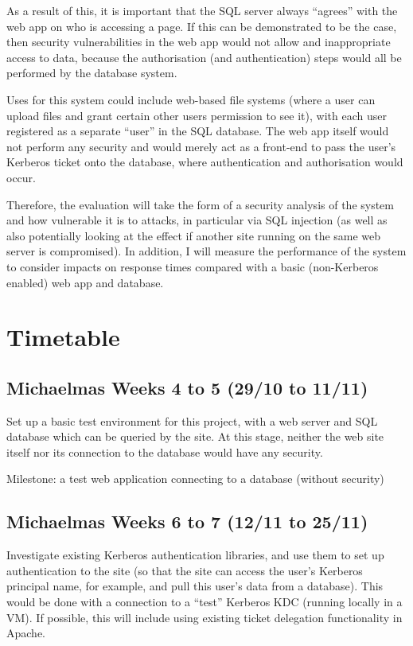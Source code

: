 \documentclass{standalone}
\begin{document}
As a result of this, it is important that the SQL server always ``agrees'' with the web app on who is accessing a page. If this can be demonstrated to be the case, then security vulnerabilities in the web app would not allow and inappropriate access to data, because the authorisation (and authentication) steps would all be performed by the database system.

Uses for this system could include web-based file systems (where a user can upload files and grant certain other users permission to see it), with each user registered as a separate ``user'' in the SQL database. The web app itself would not perform any security and would merely act as a front-end to pass the user's Kerberos ticket onto the database, where authentication and authorisation would occur.

Therefore, the evaluation will take the form of a security analysis of the system and how vulnerable it is to attacks, in particular via SQL injection (as well as also potentially looking at the effect if another site running on the same web server is compromised). In addition, I will measure the performance of the system to consider impacts on response times compared with a basic (non-Kerberos enabled) web app and database.

\section*{Timetable}
\subsection*{Michaelmas Weeks 4 to 5 (29/10 to 11/11)}
Set up a basic test environment for this project, with a web server and SQL database which can be queried by the site. At this stage, neither the web site itself nor its connection to the database would have any security.

Milestone: a test web application connecting to a database (without security)

\subsection*{Michaelmas Weeks 6 to 7 (12/11 to 25/11)}
Investigate existing Kerberos authentication libraries, and use them to set up authentication to the site (so that the site can access the user's Kerberos principal name, for example, and pull this user's data from a database). This would be done with a connection to a ``test'' Kerberos KDC (running locally in a VM). If possible, this will include using existing ticket delegation functionality in Apache.
\end{document}
